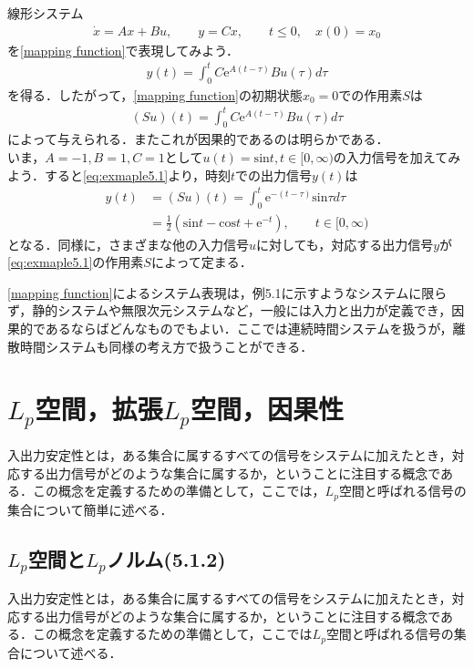 \documentclass[a4paper,11pt,uplatex]{jsarticle} %
\theoremstyle{definition}	%
\begin{document}
\begin{tcolorbox}[title=例5.1,
drop small lifted shadow=black]
線形システム
\begin{align*}
\dot{x} = Ax + Bu, \qquad y = Cx, \qquad t \leq 0 , \quad x(0) = x_0
\end{align*}
を\eqref{mapping function}で表現してみよう．
\begin{align*}
y(t) = \int_0^t C \textrm{e}^{A(t-\tau)} B u(\tau) d\tau
\end{align*}
を得る．したがって，\eqref{mapping function}の初期状態$x_0 = 0 $での作用素$S$は
\begin{align}
\label{eq:exmaple5.1}
(Su)(t) = \int_0^t C \textrm{e}^{A(t-\tau)} B u(\tau) d\tau
\end{align}
によって与えられる．またこれが因果的であるのは明らかである．\\
いま，$A = -1, B=1, C = 1$として$u(t) = \textrm{sin}t, t \in [0, \infty)$の入力信号を加えてみよう．すると\eqref{eq:exmaple5.1}より，時刻$t$での出力信号$y(t)$は
\begin{align*}
y(t) &= (Su) (t) = \int_0^t \textrm{e}^{-(t-\tau)} \textrm{sin}\tau d\tau \\
     &= \frac{1}{2} (\textrm{sin}t - \textrm{cos}t + \textrm{e}^{-t}), \qquad t \in [0, \infty)
\end{align*}
となる．同様に，さまざまな他の入力信号$u$に対しても，対応する出力信号$y$が\eqref{eq:exmaple5.1}の作用素$S$によって定まる．
\end{tcolorbox}

\eqref{mapping function}によるシステム表現は，例5.1に示すようなシステムに限らず，静的システムや無限次元システムなど，一般には入力と出力が定義でき，因果的であるならばどんなものでもよい．ここでは連続時間システムを扱うが，離散時間システムも同様の考え方で扱うことができる．

\section{$L_p$空間，拡張$L_p$空間，因果性}
入出力安定性とは，ある集合に属するすべての信号をシステムに加えたとき，対応する出力信号がどのような集合に属するか，ということに注目する概念である．この概念を定義するための準備として，ここでは，$L_p$空間と呼ばれる信号の集合について簡単に述べる．
\subsection{$L_p$空間と$L_p$ノルム(5.1.2)}
入出力安定性とは，ある集合に属するすべての信号をシステムに加えたとき，対応する出力信号がどのような集合に属するか，ということに注目する概念である．この概念を定義するための準備として，ここでは$L_p$空間と呼ばれる信号の集合について述べる．
\end{document}
